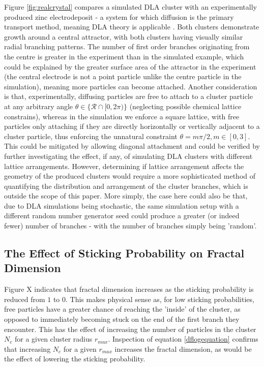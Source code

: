 \documentclass[11pt]{iopart}
\begin{document}
Figure \ref{fig:realcrystal} compares a simulated DLA cluster with an experimentally produced zinc electrodeposit - a system for which diffusion is the primary transport method, meaning DLA theory is applicable \cite{dla}. Both clusters demonstrate growth around a central attractor, with both clusters having visually similar radial branching patterns. The number of first order branches originating from the centre is greater in the experiment than in the simulated example, which could be explained by the greater surface area of the attractor in the experiment (the central electrode is not a point particle unlike the centre particle in the simulation), meaning more particles can become attached. Another consideration is that, experimentally, diffusing particles are free to attach to a cluster particle at any arbitrary angle $\theta \in \{\mathcal{R} \cap [0, 2\pi) \}$ (neglecting possible chemical lattice constrains), whereas in the simulation we enforce a square lattice, with free particles only attaching if they are directly horizontally or vertically adjacent to a cluster particle, thus enforcing the unnatural constraint $\theta = m\pi/2, m \in [0,3]$. This could be mitigated by allowing diagonal attachment and could be verified by further investigating the effect, if any, of simulating DLA clusters with different lattice arrangements. However, determining if lattice arrangement affects the geometry of the produced clusters would require a more sophisticated method of quantifying the distribution and arrangement of the cluster branches, which is outside the scope of this paper.  More simply, the case here could also be that, due to DLA simulations being stochastic, the same simulation setup with a different random number generator seed could produce a greater (or indeed fewer) number of branches -  with the number of branches simply being 'random'.

\subsection{The Effect of Sticking Probability on Fractal Dimension}

Figure X  indicates that fractal dimension increases as the sticking probability is reduced from $1$ to $0$. This makes physical sense as, for low sticking probabilities, free particles have a greater chance of reaching the 'inside' of the cluster, as opposed to immediately becoming stuck on the end of the first branch they encounter. This has the effect of increasing the number of particles in the cluster $N_c$ for a given cluster radius $r_{max}$. Inspection of equation \ref{dflogequation} confirms that increasing $N_c$ for a given $r_{max}$ increases the fractal dimension, as would be the effect of lowering the sticking probability.
\end{document}
